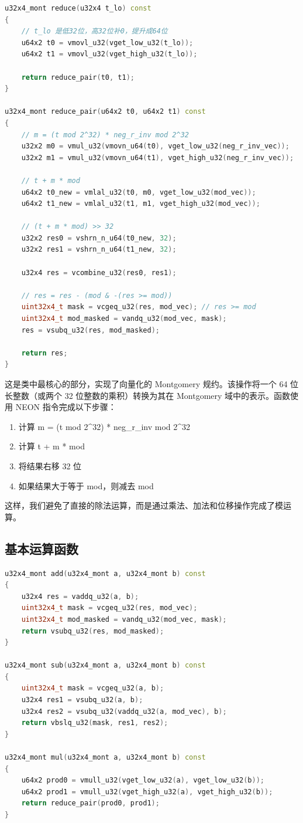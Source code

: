 \documentclass[a4paper]{article}
\begin{document}
\begin{lstlisting}[language=C++]
u32x4_mont reduce(u32x4 t_lo) const
{
    // t_lo 是低32位，高32位补0，提升成64位
    u64x2 t0 = vmovl_u32(vget_low_u32(t_lo));
    u64x2 t1 = vmovl_u32(vget_high_u32(t_lo));

    return reduce_pair(t0, t1);
}

u32x4_mont reduce_pair(u64x2 t0, u64x2 t1) const
{
    // m = (t mod 2^32) * neg_r_inv mod 2^32
    u32x2 m0 = vmul_u32(vmovn_u64(t0), vget_low_u32(neg_r_inv_vec));
    u32x2 m1 = vmul_u32(vmovn_u64(t1), vget_high_u32(neg_r_inv_vec));

    // t + m * mod
    u64x2 t0_new = vmlal_u32(t0, m0, vget_low_u32(mod_vec));
    u64x2 t1_new = vmlal_u32(t1, m1, vget_high_u32(mod_vec));

    // (t + m * mod) >> 32
    u32x2 res0 = vshrn_n_u64(t0_new, 32);
    u32x2 res1 = vshrn_n_u64(t1_new, 32);

    u32x4 res = vcombine_u32(res0, res1);

    // res = res - (mod & -(res >= mod))
    uint32x4_t mask = vcgeq_u32(res, mod_vec); // res >= mod
    uint32x4_t mod_masked = vandq_u32(mod_vec, mask);
    res = vsubq_u32(res, mod_masked);

    return res;
}
\end{lstlisting}

这是类中最核心的部分，实现了向量化的 Montgomery 规约。该操作将一个 64 位长整数（或两个 32 位整数的乘积）转换为其在 Montgomery 域中的表示。函数使用 NEON 指令完成以下步骤：

\begin{enumerate}
    \item 计算 m = (t mod 2\^{}32) * neg\_r\_inv mod 2\^{}32
    \item 计算 t + m * mod
    \item 将结果右移 32 位
    \item 如果结果大于等于 mod，则减去 mod
\end{enumerate}

这样，我们避免了直接的除法运算，而是通过乘法、加法和位移操作完成了模运算。

\subsection{基本运算函数}

\begin{lstlisting}[language=C++]
u32x4_mont add(u32x4_mont a, u32x4_mont b) const
{
    u32x4 res = vaddq_u32(a, b);
    uint32x4_t mask = vcgeq_u32(res, mod_vec);
    uint32x4_t mod_masked = vandq_u32(mod_vec, mask);
    return vsubq_u32(res, mod_masked);
}

u32x4_mont sub(u32x4_mont a, u32x4_mont b) const
{
    uint32x4_t mask = vcgeq_u32(a, b);
    u32x4 res1 = vsubq_u32(a, b);
    u32x4 res2 = vsubq_u32(vaddq_u32(a, mod_vec), b);
    return vbslq_u32(mask, res1, res2);
}

u32x4_mont mul(u32x4_mont a, u32x4_mont b) const
{
    u64x2 prod0 = vmull_u32(vget_low_u32(a), vget_low_u32(b));
    u64x2 prod1 = vmull_u32(vget_high_u32(a), vget_high_u32(b));
    return reduce_pair(prod0, prod1);
}
\end{lstlisting}
\end{document}
